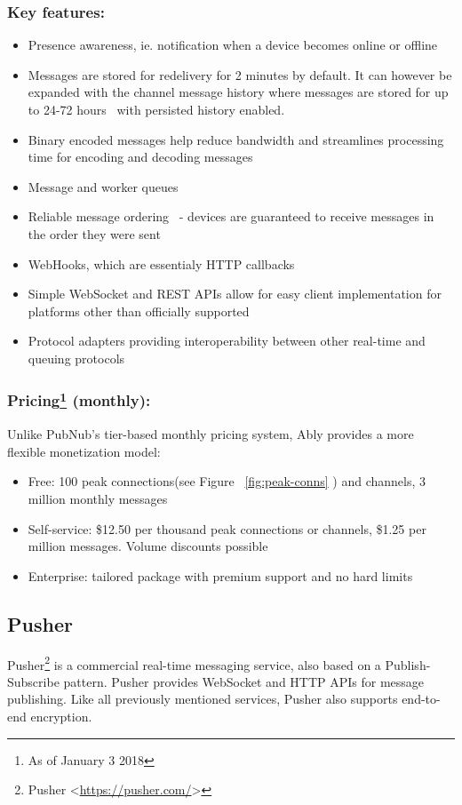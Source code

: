 \subsubsection*{Key features:}
\begin{itemize}
\item Presence awareness, ie. notification when a device becomes online or offline
\item Messages are stored for redelivery for 2 minutes by default. It can however be expanded with the channel message history where messages are stored for up to 24-72 hours~\protect\cite{ably-history} with persisted history enabled.
\item Binary encoded messages help reduce bandwidth and streamlines processing time for encoding and decoding messages~\protect\cite{ably-bin-enc}
\item Message and worker queues
\item Reliable message ordering~\protect\cite{ably-order} - devices are guaranteed to receive messages in the order they were sent
\item WebHooks, which are essentialy HTTP callbacks
\item Simple WebSocket and REST APIs allow for easy client implementation for platforms other than officially supported
\item Protocol adapters providing interoperability between other real-time and queuing protocols~\protect\cite{ably-adapters}
\end{itemize}

\subsubsection*{Pricing\footnote{As of January 3 2018} (monthly):}

Unlike PubNub's tier-based monthly pricing system, Ably provides a more flexible monetization model:
\begin{itemize}
\item Free: 100 peak connections(see Figure ~\ref{fig:peak-conns} ) and channels, 3 million monthly messages
\item Self-service: \$12.50 per thousand peak connections or channels, \$1.25 per million messages. Volume discounts possible
\item Enterprise: tailored package with premium support and no hard limits
\end{itemize}

\subsection{Pusher}
Pusher\footnote{Pusher <\url{https://pusher.com/}>} is a commercial real-time messaging service, also based on a Publish-Subscribe pattern. Pusher provides WebSocket and HTTP APIs for message publishing. Like all previously mentioned services, Pusher also supports end-to-end encryption.

